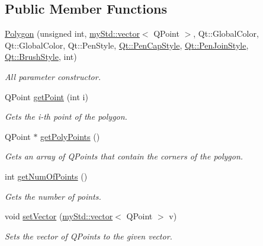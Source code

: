 \subsection*{Public Member Functions}
\begin{DoxyCompactItemize}
\item 
\hyperlink{classPolygon_ad85ab576e63cdafd2d0a821a7cebd40a}{Polygon} (unsigned int, \hyperlink{classmyStd_1_1vector}{my\+Std\+::vector}$<$ Q\+Point $>$, Qt\+::\+Global\+Color, Qt\+::\+Global\+Color, Qt\+::\+Pen\+Style, \hyperlink{shape__input__file__specs_8txt_a622efdcfef6789d4367974d2fe79019e}{Qt\+::\+Pen\+Cap\+Style}, \hyperlink{shape__input__file__specs_8txt_a007db2043c6063881de2043c05c9c4a9}{Qt\+::\+Pen\+Join\+Style}, \hyperlink{shape__input__file__specs_8txt_ad07f6fe6c28dcb0b3bdc324a72d0051f}{Qt\+::\+Brush\+Style}, int)
\begin{DoxyCompactList}\small\item\em All parameter constructor. \end{DoxyCompactList}\item 
Q\+Point \hyperlink{classPolygon_ad7e1a7964733cb80b095b7dd66fb0551}{get\+Point} (int i)
\begin{DoxyCompactList}\small\item\em Gets the i-\/th point of the polygon. \end{DoxyCompactList}\item 
Q\+Point $\ast$ \hyperlink{classPolygon_a254935fca8f07c8b337ae96e19283464}{get\+Poly\+Points} ()
\begin{DoxyCompactList}\small\item\em Gets an array of Q\+Points that contain the corners of the polygon. \end{DoxyCompactList}\item 
int \hyperlink{classPolygon_aaa21d89b5cdf770f421d19524e82734c}{get\+Num\+Of\+Points} ()
\begin{DoxyCompactList}\small\item\em Gets the number of points. \end{DoxyCompactList}\item 
void \hyperlink{classPolygon_aa7f5e838167b0c1b57320fd418325b8c}{set\+Vector} (\hyperlink{classmyStd_1_1vector}{my\+Std\+::vector}$<$ Q\+Point $>$ v)
\begin{DoxyCompactList}\small\item\em Sets the vector of Q\+Points to the given vector. \end{DoxyCompactList}\item 

\end{DoxyCompactItemize}
